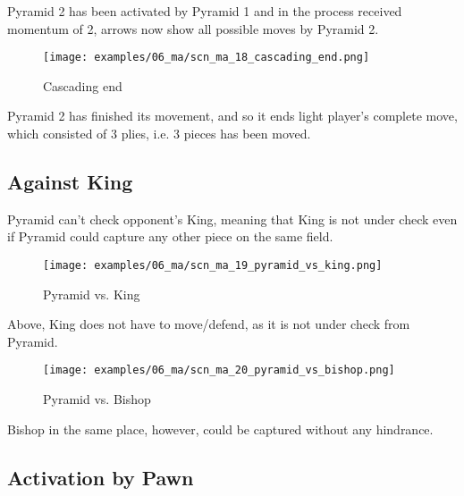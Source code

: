 Pyramid 2 has been activated by Pyramid 1 and in the process received momentum of 2,
arrows now show all possible moves by Pyramid 2.

\clearpage %

\noindent
\begin{figure}[!h]
\texttt{[image: examples/06\_ma/scn\_ma\_18\_cascading\_end.png]}
\caption{Cascading end}
\label{fig:scn_ma_18_cascading_end}
\end{figure}

Pyramid 2 has finished its movement, and so it ends light player's complete move,
which consisted of 3 plies, i.e. 3 pieces has been moved.

\clearpage %

\subsection*{Against King}
\label{sec:Mayan Ascendancy/Pyramid/Against King}

Pyramid can't check opponent's King, meaning that King is not under check even if
Pyramid could capture any other piece on the same field.

\noindent
\begin{figure}[!h]
\texttt{[image: examples/06\_ma/scn\_ma\_19\_pyramid\_vs\_king.png]}
\caption{Pyramid vs. King}
\label{fig:scn_ma_19_pyramid_vs_king}
\end{figure}

Above, King does not have to move/defend, as it is not under check from Pyramid.

\noindent
\begin{figure}[!h]
\texttt{[image: examples/06\_ma/scn\_ma\_20\_pyramid\_vs\_bishop.png]}
\caption{Pyramid vs. Bishop}
\label{fig:scn_ma_20_pyramid_vs_bishop}
\end{figure}

Bishop in the same place, however, could be captured without any hindrance.

\clearpage %

\subsection*{Activation by Pawn}
\label{sec:Mayan Ascendancy/Pyramid/Activation by Pawn}

